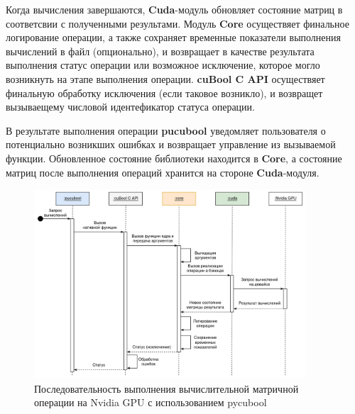 Когда вычисления завершаются, \textbf{Cuda}-модуль обновляет состояние матриц в соответсвии с полученными результами. 
Модуль \textbf{Core} осуществяет финальное логирование операции, 
а также сохраняет временные показатели выполнения вычислений в файл (опционально), 
и возвращает в качестве результата выполнения статус операции или возможное исключение, 
которое могло возникнуть на этапе выполнения операции. 
\textbf{cuBool C API} осуществяет финальную обработку исключения (если таковое возникло), 
и возвращет вызываещему числовой идентефикатор статуса операции. 

В результате выполнения операции \textbf{pucubool} уведомляет пользователя о потенциально возникших ошибках и возвращает управление из вызываемой функции. 
Обновленное состояние библиотеки находится в \textbf{Core}, а состояние матриц после выполнения операций хранится на стороне \textbf{Cuda}-модуля. 

\begin{figure}[]
    \centering
    \includegraphics[width=0.9\textwidth]{images/library_sequence_use.png}
    \caption{Последовательность выполнения вычислительной матричной операции на Nvidia GPU с использованием pycubool}
    \label{fig:cubool_sequence}
\end{figure}
